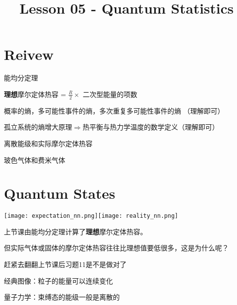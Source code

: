 \documentclass[CJK]{beamer}
\title{Lesson 05 - Quantum Statistics}
\author{}
\date{}
\begin{document}

\section{Reivew}

\begin{frame}
\bch
\bitem
\item{能均分定理}
\item{{\bf 理想}摩尔定体热容 = $\frac{R}{2}\times$ 二次型能量的项数}
\item{概率的熵，多可能性事件的熵，多次重复多可能性事件的熵 （理解即可）}
\item{孤立系统的熵增大原理$\Rightarrow$热平衡与热力学温度的数学定义（理解即可）}
\eitem
\ech
\end{frame}


\begin{frame}
\bch
\bitem
\item{离散能级和实际摩尔定体热容}
\item{玻色气体和费米气体}
\eitem
\ech
\end{frame}

\section{Quantum States}

\begin{frame}
\bch
\texttt{[image: expectation\_nn.png]}\texttt{[image: reality\_nn.png]}
\ech
\end{frame}

\begin{frame}
\bch
上节课由能均分定理计算了{\bf 理想}摩尔定体热容。

但实际气体或固体的摩尔定体热容往往比理想值要低很多，这是为什么呢？



\skipline

赶紧去翻翻上节课后习题11是不是做对了\bye

\ech
\end{frame}


\begin{frame}
\bch
{}
\emini
{}
经典图像：粒子的能量可以连续变化

量子力学：束缚态的能级一般是离散的
\emini
\ech
\end{frame}
\end{document}
